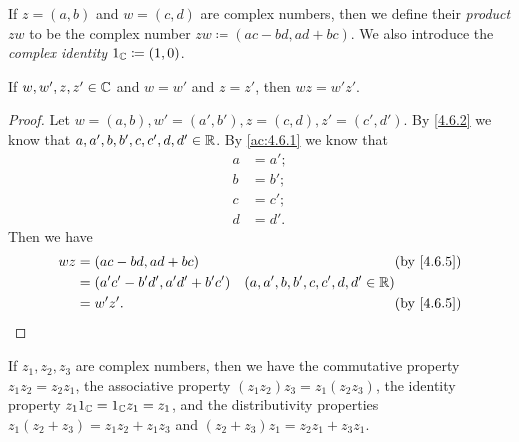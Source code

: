 \begin{defn}\label{4.6.5}
  If \(z = (a, b)\) and \(w = (c, d)\) are complex numbers, then we define their \emph{product} \(zw\) to be the complex number \(zw \coloneqq (ac - bd, ad + bc)\).
  We also introduce the \emph{complex identity} \(1_{\mathbb{C}} \coloneqq (1, 0)\).
\end{defn}

\begin{ac}\label{ac:4.6.3}
  If \(w, w', z, z' \in \mathbb{C}\) and \(w = w'\) and \(z = z'\), then \(wz = w'z'\).
\end{ac}

\begin{proof}
  Let \(w = (a, b), w' = (a', b'), z = (c, d), z' = (c', d')\).
  By \cref{4.6.2} we know that \(a, a', b, b', c, c', d, d' \in \mathbb{R}\).
  By \cref{ac:4.6.1} we know that
  \begin{align*}
    a & = a'; \\
    b & = b'; \\
    c & = c'; \\
    d & = d'.
  \end{align*}
  Then we have
  \begin{align*}
    wz & = (ac - bd, ad + bc)             &                                     & \by{4.6.5} \\
       & = (a' c' - b' d', a' d' + b' c') & (a, a', b, b', c, c', d, d' \in \R)              \\
       & = w' z'.                         &                                     & \by{4.6.5}
  \end{align*}
\end{proof}

\begin{lem}\label{4.6.6}
  If \(z_1, z_2, z_3\) are complex numbers, then we have the commutative property \(z_1 z_2 = z_2 z_1\), the associative property \((z_1 z_2) z_3 = z_1 (z_2 z_3)\), the identity property \(z_1 1_{\mathbb{C}} = 1_{\mathbb{C}} z_1 = z_1\), and the distributivity properties \(z_1 (z_2 + z_3) = z_1 z_2 + z_1 z_3\) and \((z_2 + z_3) z_1 = z_2 z_1 + z_3 z_1\).
\end{lem}

